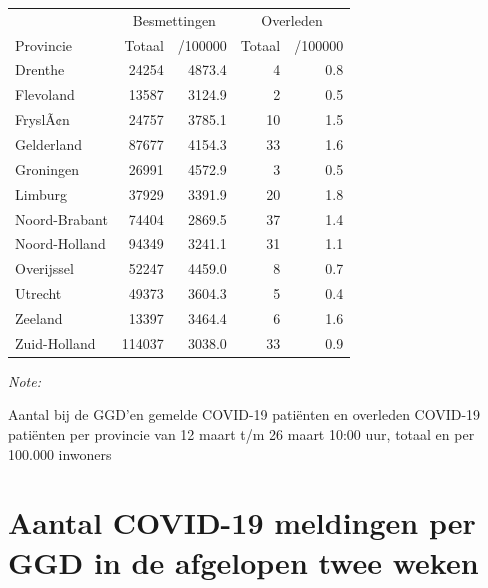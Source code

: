 \documentclass[
  english,
  man,floatsintext]{apa6}
\begin{document}
\begin{table}
\centering
\begin{threeparttable}
\begin{tabular}{lrrrr}
\toprule
\multicolumn{1}{c}{ } & \multicolumn{2}{c}{Besmettingen} & \multicolumn{2}{c}{Overleden} \\
\cmidrule(l{3pt}r{3pt}){2-3} \cmidrule(l{3pt}r{3pt}){4-5}
Provincie & Totaal & /100000 & Totaal & /100000\\
\midrule
Drenthe & 24254 & 4873.4 & 4 & 0.8\\
Flevoland & 13587 & 3124.9 & 2 & 0.5\\
FryslÃ¢n & 24757 & 3785.1 & 10 & 1.5\\
Gelderland & 87677 & 4154.3 & 33 & 1.6\\
Groningen & 26991 & 4572.9 & 3 & 0.5\\
Limburg & 37929 & 3391.9 & 20 & 1.8\\
Noord-Brabant & 74404 & 2869.5 & 37 & 1.4\\
Noord-Holland & 94349 & 3241.1 & 31 & 1.1\\
Overijssel & 52247 & 4459.0 & 8 & 0.7\\
Utrecht & 49373 & 3604.3 & 5 & 0.4\\
Zeeland & 13397 & 3464.4 & 6 & 1.6\\
Zuid-Holland & 114037 & 3038.0 & 33 & 0.9\\
\bottomrule
\end{tabular}
\begin{tablenotes}
\item \textit{Note: } 
\item Aantal bij de GGD’en gemelde COVID-19 patiënten en overleden COVID-19 patiënten per provincie van 12 maart t/m 26 maart 10:00 uur, totaal en per 100.000 inwoners
\end{tablenotes}
\end{threeparttable}
\end{table}

\newpage

\hypertarget{aantal-covid-19-meldingen-per-ggd-in-de-afgelopen-twee-weken}{%
\section{Aantal COVID-19 meldingen per GGD in de afgelopen twee weken}\label{aantal-covid-19-meldingen-per-ggd-in-de-afgelopen-twee-weken}}
\end{document}
